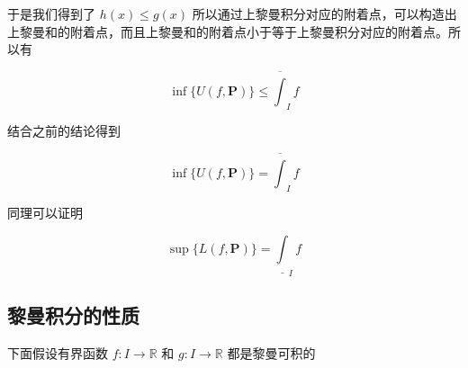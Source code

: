 于是我们得到了 $h(x) \le g(x)$ 所以通过上黎曼积分对应的附着点，可以构造出上黎曼和的附着点，而且上黎曼和的附着点小于等于上黎曼积分对应的附着点。所以有

\[
 \inf \{ U(f, \mathbf{P}) \}   \le  \overline{\int}_I f
\]

结合之前的结论得到

\[
 \inf \{ U(f, \mathbf{P}) \}  =  \overline{\int}_I f
\]

同理可以证明


\[
 \sup \{ L(f, \mathbf{P}) \}  =  \underline{\int}_I f
\]

\subsection{黎曼积分的性质}

下面假设有界函数 $f: I \to \mathbb{R}$ 和 $g: I \to \mathbb{R}$ 都是黎曼可积的

